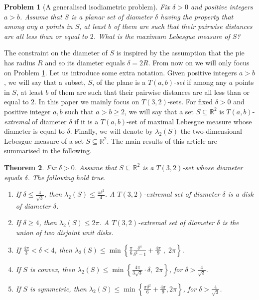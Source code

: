 \documentclass[12pt]{article}
\newtheorem{thm}{Theorem}[section]
\newtheorem{prbl}[thm]{Problem}
\begin{document}
\begin{prbl}[A generalised isodiametric problem]
\label{probone}
Fix $\delta>0$ and positive integers $a>b$. Assume that $S$ is a planar set of 
diameter $\delta$ having 
the property that
among any $a$ points in $S$, at least $b$ of them are such that 
their pairwise distances are  all
less than or equal to $2$. What is the
maximum Lebesgue measure of $S$? 
\end{prbl}

The constraint on the diameter of $S$ is inspired by the assumption that the pie has radius $R$ 
and so its diameter equals $\delta= 2R$. 
From now on we will only focus on Problem \ref{probone}. 
Let us introduce some extra notation.  
Given positive integers $a>b$, we will say that a subset, $S$, 
of the plane is a $T(a,b)$-\emph{set} if 
among any $a$ points in $S$, at least $b$ of them 
are such that their pairwise distances are all less than or equal to $2$.
In this paper we mainly focus on $T(3,2)$-sets. 
For fixed $\delta>0$ and positive integer $a,b$ such that $a>b\geq 2$, 
we will say that a set $S\subseteq \mathbb{R}^2$ is $T(a,b)$-\emph{extremal} of diameter $\delta$ if it 
is a $T(a,b)$-set of maximal Lebesgue measure 
whose diameter is equal to $\delta$. 
Finally, we will denote by $\lambda_2(S)$ the two-dimensional Lebesgue measure of a set $S\subseteq \mathbb{R}^2$.
The main results of this article are summarised in the following. 

\begin{thm}\label{main} Fix $\delta >0$. Assume that $S\subseteq \mathbb{R}^2$ is a $T(3,2)$-set 
whose diameter equals $\delta$. 
The following hold true.
\begin{enumerate}
\item If $\delta \leq \frac{4}{\sqrt{3}}$, then $\lambda_2(S) \leq \frac{\pi \delta^2}{4}$. A $T(3,2)$-extremal set 
of diameter $\delta$ is 
a disk of diameter $\delta$.
\item  If $\delta \geq 4$, then $\lambda_2(S) \leq 2\pi$. A $T(3,2)$-extremal set of diameter $\delta$
 is the union of two disjoint unit disks. 
\item  If $\frac{4\pi}{3}< \delta < 4$, then $\lambda_2(S) \leq 
\min\left\{\frac{\pi}{6}\frac{\delta^4}{\delta^2-1}+\frac{4\pi}{9}\;,\; 2\pi \right\} $.
\item If  $S$ is \emph{convex}, then 
$\lambda_2(S)\leq  \min\left\{\frac{4\pi}{3\sqrt{3}}\cdot\delta, \; 
2\pi \right\}$, for $\delta>\frac{4}{\sqrt{3}}$.
\item If $S$ is \emph{symmetric}, then $\lambda_2(S)\leq \min\left\{\frac{\pi \delta^2}{6} + \frac{4\pi}{9}, 2\pi \right\}$, for $\delta>\frac{4}{\sqrt{3}}$.
\end{enumerate}
\end{thm} 
\end{document}
